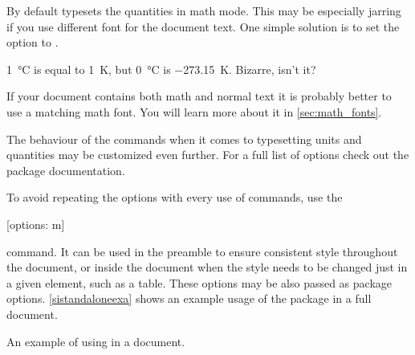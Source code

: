 By default  typesets the quantities in math mode. This may be
especially jarring if you use different font for the document text. One simple
solution is to set the  option to .
\begin{example}
\setmainfont{Source Sans Pro} %
\qty{1}{\degreeCelsius} is
equal to \qty{1}{\kelvin},
but \qty[
  mode = text,
]{0}{\degreeCelsius} is \qty[
  mode = text,
]{-273.15}{\kelvin}.
Bizarre, isn't it?
\end{example}
If your document contains both math and normal text it is probably better to
use a matching math font. You will learn more about it in
\autoref{sec:math_fonts}.

The behaviour of the commands when it comes to typesetting units and quantities
may be customized even further. For a full list of options check out the
 package documentation.

To avoid repeating the options with every use of commands, use the
\begin{lscommand}
  [options: m]
\end{lscommand}
command. It can be used in the preamble to ensure consistent style throughout
the document, or inside the document when the style needs to be changed just
in a given element, such as a table. These options may be also passed as package
options. \autoref{sistandaloneexa} shows an example usage of the package in
a full document.
\begin{listing}
  \caption{An example of using  in a document.}%
  \label{sistandaloneexa}
\end{listing}

